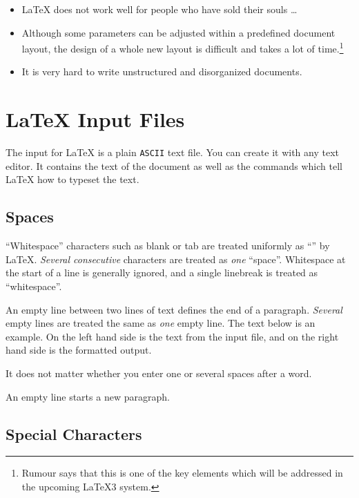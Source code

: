 \begin{itemize}
\item \LaTeX{} does not work well for people who have sold their
  souls \ldots
\item Although some parameters can be adjusted within a predefined
  document layout, the design of a whole new layout is difficult and
  takes a lot of time.\footnote{Rumour says that this is one of the
    key elements which will be addressed in the upcoming \LaTeX 3
    system.}
\item It is very hard to write unstructured and disorganized documents.
\end{itemize}
 
\section{\LaTeX{} Input Files}

The input for \LaTeX{} is a plain \texttt{ASCII} text file. You can create it
with any text editor. It contains the text of the document as well as
the commands which tell \LaTeX{} how to typeset the text.

\subsection{Spaces}

``Whitespace'' characters such as blank or tab are
treated uniformly as ``'' by \LaTeX{}. \emph{Several
  consecutive}  characters are treated as \emph{one}
``space''.  Whitespace at the start of a line is generally ignored, and
a single linebreak is treated as ``whitespace''.

An empty line between two lines of text defines the end of a
paragraph. \emph{Several} empty lines are treated the same as
\emph{one} empty line. The text below is an example. On the left hand
side is the text from the input file, and on the right hand side is the
formatted output.

\begin{example}
It does not matter whether you
enter one or several     spaces
after a word.

An empty line starts a new 
paragraph.
\end{example}
 
\subsection{Special Characters}

